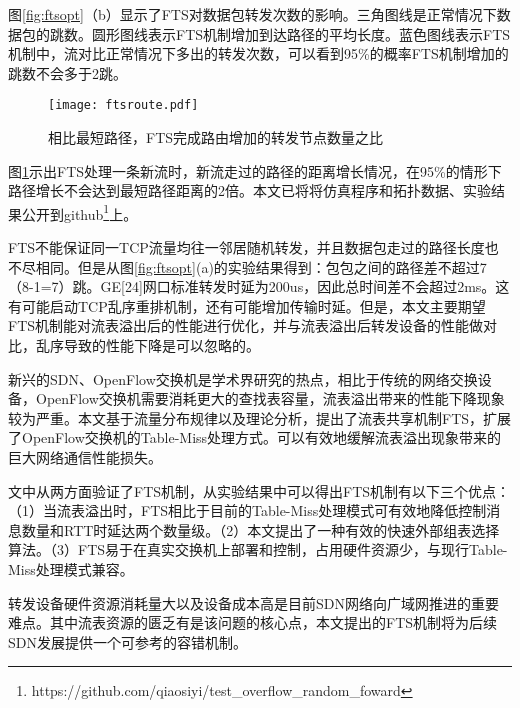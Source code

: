 图\ref{fig:ftsopt}（b）显示了FTS对数据包转发次数的影响。三角图线是正常情况下数据包的跳数。圆形图线表示FTS机制增加到达路径的平均长度。蓝色图线表示FTS机制中，流对比正常情况下多出的转发次数，可以看到95\%的概率FTS机制增加的跳数不会多于2跳。

\begin{figure}[!ht]
	\centering 
	\vspace{-1.5mm} 
	\texttt{[image: ftsroute.pdf]}
	\caption{相比最短路径，FTS完成路由增加的转发节点数量之比} \label{fig:ftsroute}
\end{figure}

图\ref{fig:ftsroute}示出FTS处理一条新流时，新流走过的路径的距离增长情况，在95\%的情形下路径增长不会达到最短路径距离的2倍。本文已将将仿真程序和拓扑数据、实验结果公开到github\footnote{https://github.com/qiaosiyi/test\_overflow\_random\_foward}上。



FTS不能保证同一TCP流量均往一邻居随机转发，并且数据包走过的路径长度也不尽相同。但是从图\ref{fig:ftsopt}(a)的实验结果得到：包包之间的路径差不超过7（8-1=7）跳。GE[24]网口标准转发时延为200us，因此总时间差不会超过2ms。这有可能启动TCP乱序重排机制，还有可能增加传输时延。但是，本文主要期望FTS机制能对流表溢出后的性能进行优化，并与流表溢出后转发设备的性能做对比，乱序导致的性能下降是可以忽略的。


新兴的SDN、OpenFlow交换机是学术界研究的热点，相比于传统的网络交换设备，OpenFlow交换机需要消耗更大的查找表容量，流表溢出带来的性能下降现象较为严重。本文基于流量分布规律以及理论分析，提出了流表共享机制FTS，扩展了OpenFlow交换机的Table-Miss处理方式。可以有效地缓解流表溢出现象带来的巨大网络通信性能损失。

文中从两方面验证了FTS机制，从实验结果中可以得出FTS机制有以下三个优点：（1）当流表溢出时，FTS相比于目前的Table-Miss处理模式可有效地降低控制消息数量和RTT时延达两个数量级。（2）本文提出了一种有效的快速外部组表选择算法。（3）FTS易于在真实交换机上部署和控制，占用硬件资源少，与现行Table-Miss处理模式兼容。

转发设备硬件资源消耗量大以及设备成本高是目前SDN网络向广域网推进的重要难点。其中流表资源的匮乏有是该问题的核心点，本文提出的FTS机制将为后续SDN发展提供一个可参考的容错机制。






